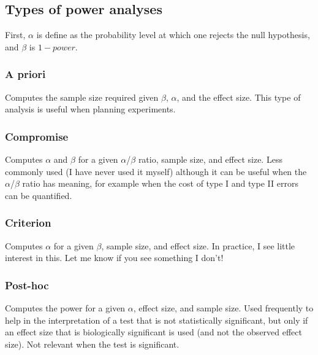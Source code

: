 \documentclass[
  12pt,
]{book}
\begin{document}
\hypertarget{types-of-power-analyses}{%
\subsection{Types of power analyses}\label{types-of-power-analyses}}

First, \(\alpha\) is define as the probability level at which
one rejects the null hypothesis, and \(\beta\) is \(1 - power\).

\hypertarget{a-priori}{%
\subsubsection*{A priori}\label{a-priori}}

Computes the sample size required given \(\beta\), \(\alpha\), and the effect size. This type of analysis is useful when planning experiments.

\hypertarget{compromise}{%
\subsubsection*{Compromise}\label{compromise}}

Computes \(\alpha\) and \(\beta\) for a given \(\alpha\)/\(\beta\) ratio, sample size, and effect size. Less commonly used (I have never used it myself) although it can be useful when the \(\alpha\)/\(\beta\) ratio has meaning, for example when the cost of type I and type II errors can be quantified.

\hypertarget{criterion}{%
\subsubsection*{Criterion}\label{criterion}}

Computes \(\alpha\) for a given \(\beta\), sample size, and effect size. In practice, I see little interest in this. Let me know if you see something I don't!

\hypertarget{post-hoc}{%
\subsubsection*{Post-hoc}\label{post-hoc}}

Computes the power for a given \(\alpha\), effect size, and
sample size. Used frequently to help in the interpretation of a test
that is not statistically significant, but only if an effect size that is
biologically significant is used (and not the observed effect size). Not
relevant when the test is significant.
\end{document}
